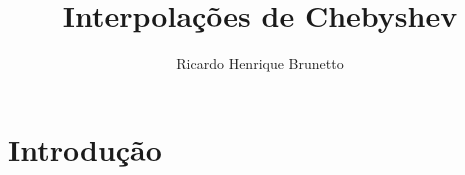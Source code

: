 

\sloppy

\title{Interpolações de Chebyshev}

\author{Ricardo Henrique Brunetto}

\address{Departamento de Informática -- Universidade Estadual de Maringá (UEM)\\
	Maringá -- PR -- Brasil
}



	\maketitle

  \section{Introdução}

	
	


